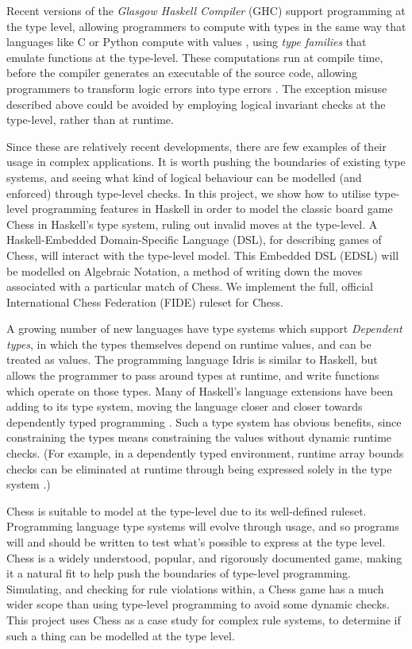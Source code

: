\documentclass[12pt, a4paper, bibliography=totocnumbered]{scrreprt}
\begin{document}
Recent versions of the \emph{Glasgow Haskell Compiler} (GHC) support programming at the type level, allowing programmers to compute with types in the same way that languages like C or Python compute with values \cite{givingpromotion}, using \emph{type families} \cite{opentfs} \cite{closedtfs} that emulate functions at the type-level. These computations run at compile time, before the compiler generates an executable of the source code, allowing programmers to transform logic errors into type errors \cite{twt}. The exception misuse described above could be avoided by employing logical invariant checks at the type-level, rather than at runtime.

Since these are relatively recent developments, there are few examples of their usage in complex applications. It is worth pushing the boundaries of existing type systems, and seeing what kind of logical behaviour can be modelled (and enforced) through type-level checks. In this project, we show how to utilise type-level programming features in Haskell in order to model the classic board game Chess in Haskell's type system, ruling out invalid moves at the type-level. A Haskell-Embedded Domain-Specific Language (DSL), for describing games of Chess, will interact with the type-level model. This Embedded DSL (EDSL) will be modelled on Algebraic Notation, a method of writing down the moves associated with a particular match of Chess. We implement the full, official International Chess Federation (FIDE) ruleset for Chess.

A growing number of new languages have type systems which support \emph{Dependent types}, in which the types themselves depend on runtime values, and can be treated as values. The programming language Idris is similar to Haskell, but allows the programmer to pass around types at runtime, and write functions which operate on those types. Many of Haskell's language extensions have been adding to its type system, moving the language closer and closer towards dependently typed programming \cite{singletons}. Such a type system has obvious benefits, since constraining the types means constraining the values without dynamic runtime checks. (For example, in a dependently typed environment, runtime array bounds checks can be eliminated at runtime through being expressed solely in the type system \cite{dependentarray}.)

Chess is suitable to model at the type-level due to its well-defined ruleset. Programming language type systems will evolve through usage, and so programs will and should be written to test what's possible to express at the type level. Chess is a widely understood, popular, and rigorously documented game, making it a natural fit to help push the boundaries of type-level programming. Simulating, and checking for rule violations within, a Chess game has a much wider scope than using type-level programming to avoid some dynamic checks. This project uses Chess as a case study for complex rule systems, to determine if such a thing can be modelled at the type level.
\end{document}
